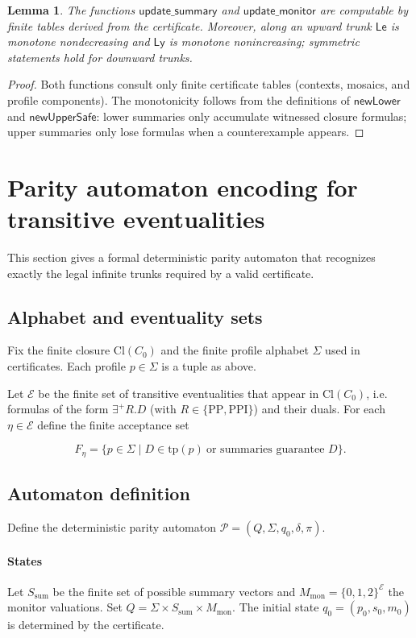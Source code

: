 \documentclass[11pt]{article}
\newcommand{\PP}{\mathrm{PP}}
\newcommand{\PPI}{\mathrm{PPI}}
\newcommand{\Cl}{\mathrm{Cl}}
\newcommand{\tp}{\mathrm{tp}}
\newtheorem{lemma}[theorem]{Lemma}
\begin{document}
\begin{lemma}
\label{lem:update-computable}
The functions $\mathsf{update\_summary}$ and $\mathsf{update\_monitor}$ are
computable by finite tables derived from the certificate. Moreover, along an
upward trunk $\mathsf{Le}$ is monotone nondecreasing and $\mathsf{Ly}$ is
monotone nonincreasing; symmetric statements hold for downward trunks.
\end{lemma}

\begin{proof}
Both functions consult only finite certificate tables (contexts, mosaics, and
profile components). The monotonicity follows from the definitions of
$\mathsf{newLower}$ and $\mathsf{newUpperSafe}$: lower summaries only
accumulate witnessed closure formulas; upper summaries only lose formulas
when a counterexample appears.
\end{proof}


\section{Parity automaton encoding for transitive eventualities}
\label{sec:parity-encoding}

This section gives a formal deterministic parity automaton that recognizes
exactly the legal infinite trunks required by a valid certificate.

\subsection{Alphabet and eventuality sets}
Fix the finite closure $\Cl(C_0)$ and the finite profile alphabet $\Sigma$
used in certificates. Each profile $p\in\Sigma$ is a tuple as above.

Let $\mathcal{E}$ be the finite set of transitive eventualities that appear in
$\Cl(C_0)$, i.e. formulas of the form $\exists^{+}R.D$ (with
$R\in\{\PP,\PPI\}$) and their duals. For each $\eta\in\mathcal{E}$ define the
finite acceptance set


\[
F_\eta=\{p\in\Sigma\mid D\in\tp(p)\ \text{or summaries guarantee }D\}.
\]



\subsection{Automaton definition}
Define the deterministic parity automaton $\mathcal{P}=(Q,\Sigma,q_0,\delta,\pi)$.

\paragraph{States}
Let $S_{\mathrm{sum}}$ be the finite set of possible summary vectors and
$M_{\mathrm{mon}}=\{0,1,2\}^{\mathcal{E}}$ the monitor valuations. Set
$Q=\Sigma\times S_{\mathrm{sum}}\times M_{\mathrm{mon}}$. The initial state
$q_0=(p_0,s_0,m_0)$ is determined by the certificate.
\end{document}
